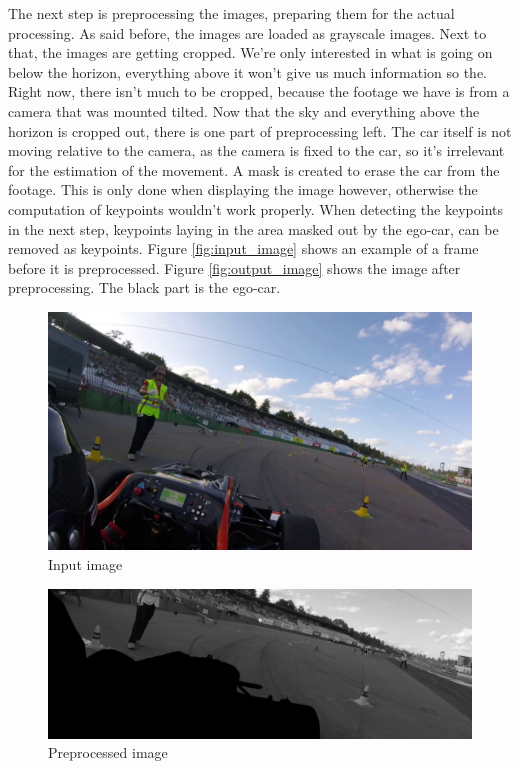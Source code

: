 The next step is preprocessing the images, preparing them for the actual processing. As said before, the images are loaded as grayscale images. Next to that, the images are getting cropped. We're only interested in what is going on below the horizon, everything above it won't give us much information so the. Right now, there isn't much to be cropped, because the footage we have is from a camera that was mounted tilted. Now that the sky and everything above the horizon is cropped out, there is one part of preprocessing left. The car itself is not moving relative to the camera, as the camera is fixed to the car, so it's irrelevant for the estimation of the movement. A mask is created to erase the car from the footage. This is only done when displaying the image however, otherwise the computation of keypoints wouldn't work properly. When detecting the keypoints in the next step, keypoints laying in the area masked out by the ego-car, can be removed as keypoints. Figure \autoref{fig:input_image} shows an example of a frame before it is preprocessed. Figure \autoref{fig:output_image} shows the image after preprocessing. The black part is the ego-car.

\begin{figure}
    \centering
    \includegraphics[width=1\textwidth]{figures/input_image.jpg}
    \caption{Input image}
    \label{fig:input_image}
\end{figure}

\begin{figure}
    \centering
    \includegraphics[width=1\textwidth]{figures/output_image.jpg}
    \caption{Preprocessed image}
    \label{fig:output_image}
\end{figure}